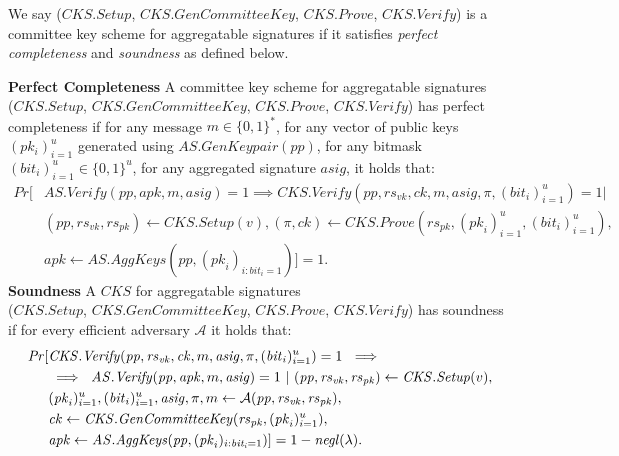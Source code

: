 \begin{definition}
\noindent We say ($\mathit{CKS.Setup}$, $\mathit{CKS.GenCommitteeKey}$, $\mathit{CKS.Prove}$, $\mathit{CKS.Verify}$) 
is a committee key scheme for aggregatable signatures if it satisfies \emph{perfect completeness} and 
\emph{soundness} as defined below.

\noindent \textbf{Perfect Completeness} A committee key scheme for aggregatable signatures \\
($\mathit{CKS.Setup}$, $\mathit{CKS.GenCommitteeKey}$, $\mathit{CKS.Prove}$, $\mathit{CKS.Verify}$)
has perfect completeness if for any message $m \in \{0,1\}^*$, 
for any vector of public keys $(\mathit{pk_i})_{i=1}^{u}$ generated using $\mathit{AS.GenKeypair}(\mathit{pp})$, 
for any bitmask $(\mathit{bit_i})_{i=1}^{u} \in \{0,1\}^u$,  for any aggregated signature $\mathit{asig}$, 
it holds that: 
\vspace{-0.1cm}
\begin{align*}
\mathit{Pr}[&\mathit{AS.Verify}(\mathit{pp}, \mathit{apk}, m, \mathit{asig}) = 1 \implies 
\mathit{CKS.Verify}(\mathit{pp}, \mathit{rs}_{\mathit{vk}}, \mathit{ck}, m, \mathit{asig}, \pi, (\mathit{bit}_{i})_{i=1}^u) =1 | \\
& (\mathit{pp}, \mathit{rs}_{\mathit{vk}}, \mathit{rs}_{\mathit{pk}}) \leftarrow 
\mathit{CKS.Setup}(v), 
(\pi, \mathit{ck}) \leftarrow \mathit{CKS.Prove}(\mathit{rs}_{\mathit{pk}}, (\mathit{pk}_{i})_{i=1}^u, (\mathit{bit_i})_{i=1}^u), \\
& \mathit{apk} \leftarrow \mathit{AS.AggKeys}(\mathit{pp}, (\mathit{pk}_{i})_{i:\mathit{bit_i}=1})]=1.
\end{align*} 
\vspace{-0.08cm}
\noindent \textbf{Soundness} A $\mathit{CKS}$ for aggregatable signatures \\
($\mathit{CKS.Setup}$, $\mathit{CKS.GenCommitteeKey}$, $\mathit{CKS.Prove}$, $\mathit{CKS.Verify}$)
has soundness if for every efficient adversary $\mathcal{A}$ it holds that: 
\begin{align*}
\mathit{Pr}[&\mathit{CKS.Verify}(\mathit{pp}, \mathit{rs}_{\mathit{vk}}, \mathit{ck}, m,  \mathit{asig}, \pi, (\mathit{bit}_{i})_{i=1}^u) =1 \
 \implies \\
 &\implies \ \mathit{AS.Verify}(\mathit{pp}, \mathit{apk}, m, \mathit{asig}) = 1  \  |  \ 
 (\mathit{pp}, \mathit{rs}_{\mathit{vk}},\mathit{rs}_{\mathit{pk}}) \leftarrow \mathit{CKS.Setup}(v),\\
& (\mathit{pk}_{i})_{i=1}^u, (\mathit{bit}_{i})_{i=1}^u, \mathit{asig}, \pi, m  \leftarrow \mathcal{A}(\mathit{pp}, \mathit{rs}_{\mathit{vk}}, \mathit{rs}_{\mathit{pk}}), \\
& \mathit{ck} \leftarrow \mathit{CKS.GenCommitteeKey}(\mathit{rs}_{\mathit{pk}}, (\mathit{pk}_{i})_{i=1}^u), \\
& \mathit{apk} \leftarrow \mathit{AS.AggKeys}( \mathit{pp},( \mathit{pk}_{i})_{i:\mathit{bit_i}=1})] = 1 - \negl(\lambda).
\end{align*}
\end{definition}

